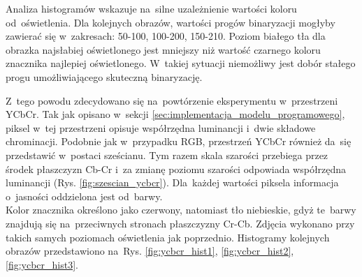  Analiza histogramów wskazuje na~silne uzależnienie wartości koloru od~oświetlenia. Dla kolejnych obrazów, wartości progów binaryzacji mogłyby zawierać się w~zakresach: 50-100, 100-200, 150-210. Poziom białego tła dla obrazka najsłabiej oświetlonego jest mniejszy niż wartość czarnego koloru znacznika najlepiej oświetlonego. W~takiej sytuacji niemożliwy jest dobór stałego progu umożliwiającego skuteczną binaryzację.\par
 Z~tego powodu zdecydowano się na~powtórzenie eksperymentu w~przestrzeni YCbCr. Tak jak opisano w~sekcji \ref{sec:implementacja_modelu_programowego}, piksel w~tej przestrzeni opisuje współrzędna luminancji i~dwie składowe chrominacji. Podobnie jak w~przypadku RGB, przestrzeń YCbCr również da~się przedstawić w~postaci sześcianu. Tym razem skala szarości przebiega przez środek płaszczyzn Cb-Cr i~za zmianę poziomu szarości odpowiada współrzędna luminancji (Rys. \ref{fig:szescian_ycbcr}). Dla~każdej wartości piksela informacja o~jasności oddzielona jest od~barwy.\\
 Kolor znacznika określono jako czerwony, natomiast tło niebieskie, gdyż te~barwy znajdują się na~przeciwnych stronach płaszczyzny Cr-Cb. Zdjęcia wykonano przy takich samych poziomach oświetlenia jak poprzednio. Histogramy kolejnych obrazów przedstawiono na~Rys. \ref{fig:ycbcr_hist1}, \ref{fig:ycbcr_hist2}, \ref{fig:ycbcr_hist3}. 
